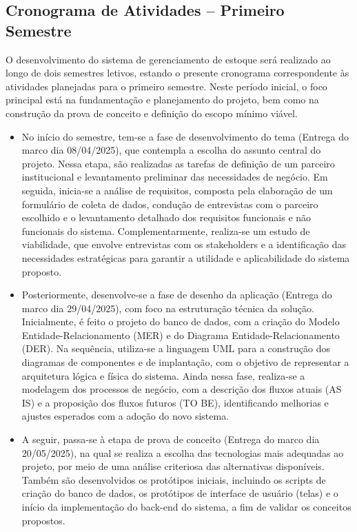 \documentclass[
	12pt,				%
	openany,			%
	twoside,			%
	a4paper,			%
	english,			%
	brazil				%
	]{abntex2}
\begin{document}
\subsection{Cronograma de Atividades – Primeiro Semestre}

O desenvolvimento do sistema de gerenciamento de estoque será realizado ao longo de dois semestres letivos, estando o presente cronograma correspondente às atividades planejadas para o primeiro semestre. Neste período inicial, o foco principal está na fundamentação e planejamento do projeto, bem como na construção da prova de conceito e definição do escopo mínimo viável.
\begin{itemize}

   \item No início do semestre, tem-se a fase de desenvolvimento do tema (Entrega do marco dia 08/04/2025), que contempla a escolha do assunto central do projeto. Nessa etapa, são realizadas as tarefas de definição de um parceiro institucional e levantamento preliminar das necessidades de negócio. Em seguida, inicia-se a análise de requisitos, composta pela elaboração de um formulário de coleta de dados, condução de entrevistas com o parceiro escolhido e o levantamento detalhado dos requisitos funcionais e não funcionais do sistema. Complementarmente, realiza-se um estudo de viabilidade, que envolve entrevistas com os stakeholders e a identificação das necessidades estratégicas para garantir a utilidade e aplicabilidade do sistema proposto.

  \item Posteriormente, desenvolve-se a fase de desenho da aplicação (Entrega do marco dia 29/04/2025), com foco na estruturação técnica da solução. Inicialmente, é feito o projeto do banco de dados, com a criação do Modelo Entidade-Relacionamento (MER) e do Diagrama Entidade-Relacionamento (DER). Na sequência, utiliza-se a linguagem UML para a construção dos diagramas de componentes e de implantação, com o objetivo de representar a arquitetura lógica e física do sistema. Ainda nessa fase, realiza-se a modelagem dos processos de negócio, com a descrição dos fluxos atuais (AS IS) e a proposição dos fluxos futuros (TO BE), identificando melhorias e ajustes esperados com a adoção do novo sistema.

  \item A seguir, passa-se à etapa de prova de conceito (Entrega do marco dia 20/05/2025), na qual se realiza a escolha das tecnologias mais adequadas ao projeto, por meio de uma análise criteriosa das alternativas disponíveis. Também são desenvolvidos os protótipos iniciais, incluindo os scripts de criação do banco de dados, os protótipos de interface de usuário (telas) e o início da implementação do back-end do sistema, a fim de validar os conceitos propostos.


\end{itemize}
\end{document}
